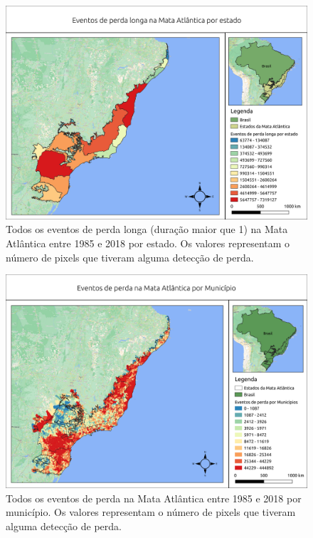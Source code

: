 \begin{figure}[H]
    \centering
    \includegraphics[scale=.5]{images/estados_loss_masked85_maskedGain_neq1.png}
    \caption{Todos os eventos de perda longa (duração maior que 1) na Mata Atlântica entre 1985 e 2018 por estado. Os valores representam o número de pixels que tiveram alguma detecção de perda.}
    \label{fig:estados_loss_masked85_maskedgain_neq1}
\end{figure}

\begin{figure}[H]
    \centering
    \includegraphics[scale=.5]{images/mun_loss_mun_masked85_maskedgain.png}
    \caption{Todos os eventos de perda na Mata Atlântica entre 1985 e 2018 por município. Os valores representam o número de pixels que tiveram alguma detecção de perda.}
    \label{fig:mun_loss_masked85_maskedgain}
\end{figure}

